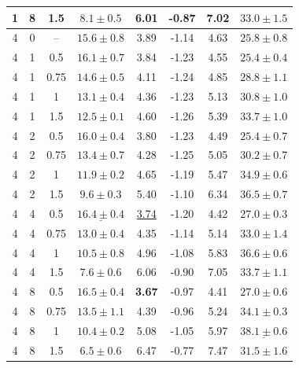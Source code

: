 \documentclass{article}
\begin{document}
\begin{table}[!htbp]
\begin{tabular}{cccccccc}
1 & 8 & 1.5 & $8.1\pm0.5$ & 6.01 & -0.87 & 7.02 & $33.0\pm1.5$\\
\midrule
4 & 0 & -- & $15.6\pm0.8$ & 3.89 & -1.14 & 4.63 & $25.8\pm0.8$\\
4 & 1 & 0.5 & $16.1\pm0.7$ & 3.84 & -1.23 & 4.55 & $25.4\pm0.4$\\
4 & 1 & 0.75 & $14.6\pm0.5$ & 4.11 & -1.24 & 4.85 & $28.8\pm1.1$\\
4 & 1 & 1 & $13.1\pm0.4$ & 4.36 & -1.23 & 5.13 & $30.8\pm1.0$\\
4 & 1 & 1.5 & $12.5\pm0.1$ & 4.60 & -1.26 & 5.39 & $33.7\pm1.0$\\
4 & 2 & 0.5 & $16.0\pm0.4$ & 3.80 & -1.23 & 4.49 & $25.4\pm0.7$\\
4 & 2 & 0.75 & $13.4\pm0.7$ & 4.28 & -1.25 & 5.05 & $30.2\pm0.7$\\
4 & 2 & 1 & $11.9\pm0.2$ & 4.65 & -1.19 & 5.47 & $34.9\pm0.6$\\
4 & 2 & 1.5 & $9.6\pm0.3$ & 5.40 & -1.10 & 6.34 & $36.5\pm0.7$\\
4 & 4 & 0.5 & $\underline{16.4\pm0.4}$& \underline{3.74}& -1.20 & 4.42 & $27.0\pm0.3$\\
4 & 4 & 0.75 & $13.0\pm0.4$ & 4.35 & -1.14 & 5.14 & $33.0\pm1.4$\\
4 & 4 & 1 & $10.5\pm0.8$ & 4.96 & -1.08 & 5.83 & $36.6\pm0.6$\\
4 & 4 & 1.5 & $7.6\pm0.6$ & 6.06 & -0.90 & 7.05 & $33.7\pm1.1$\\
4 & 8 & 0.5 & $\mathbf{16.5\pm0.4}$& \textbf{3.67}& -0.97 & 4.41 & $27.0\pm0.6$\\
4 & 8 & 0.75 & $13.5\pm1.1$ & 4.39 & -0.96 & 5.24 & $34.1\pm0.3$\\
4 & 8 & 1 & $10.4\pm0.2$ & 5.08 & -1.05 & 5.97 & $\underline{38.1\pm0.6}$\\
4 & 8 & 1.5 & $6.5\pm0.6$ & 6.47 & -0.77 & 7.47 & $31.5\pm1.6$\\
\bottomrule
\end{tabular}
\end{table}
\clearpage
\end{document}
